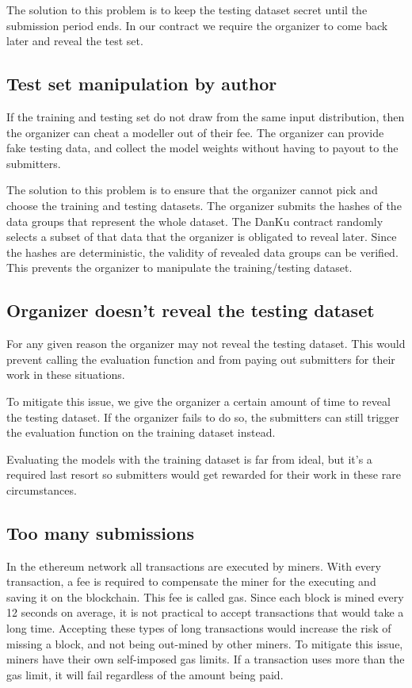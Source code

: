 \documentclass{article}
\begin{document}
The solution to this problem is to keep the testing dataset secret until the submission period ends. In our contract we require the organizer to come back later and reveal the test set.

\subsection{Test set manipulation by author}
\label{test_set_manipulation_by_author}

If the training and testing set do not draw from the same input distribution, then the organizer can cheat a modeller out of their fee. The organizer can provide fake testing data, and collect the model weights without having to payout to the submitters.

The solution to this problem is to ensure that the organizer cannot pick and choose the training and testing datasets. The organizer submits the hashes of the data groups that represent the whole dataset. The DanKu contract randomly selects a subset of that data that the organizer is obligated to reveal later. Since the hashes are deterministic, the validity of revealed data groups can be verified. This prevents the organizer to manipulate the training/testing dataset.

\subsection{Organizer doesn’t reveal the testing dataset}

For any given reason the organizer may not reveal the testing dataset. This would prevent calling the evaluation function and from paying out submitters for their work in these situations.

To mitigate this issue, we give the organizer a certain amount of time to reveal the testing dataset. If the organizer fails to do so, the submitters can still trigger the evaluation function on the training dataset instead.

Evaluating the models with the training dataset is far from ideal, but it’s a required last resort so submitters would get rewarded for their work in these rare circumstances.

\subsection{Too many submissions}

In the ethereum network all transactions are executed by miners. With every transaction, a fee is required to compensate the miner for the executing and saving it on the blockchain. This fee is called gas. Since each block is mined every 12 seconds on average, it is not practical to accept transactions that would take a long time. Accepting these types of long transactions would increase the risk of missing a block, and not being out-mined by other miners. To mitigate this issue, miners have their own self-imposed gas limits. If a transaction uses more than the gas limit, it will fail regardless of the amount being paid.
\end{document}

